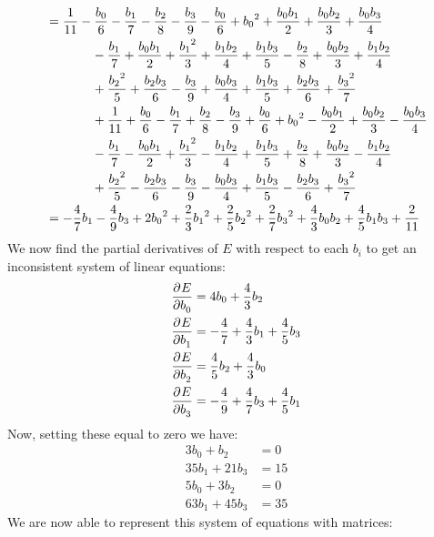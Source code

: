 \documentclass{scrartcl}
\begin{document}
\begin{align*}
&=\frac{1}{11}-\frac{b_0}{6}-\frac{b_1}{7}-\frac{b_2}{8}-\frac{b_3}{9}-\frac{b_0}{6}+{b_0}^2+\frac{b_0b_1}{2}+\frac{b_0b_2}{3}+\frac{b_0b_3}{4}\\
&\hspace{0.5 in}-\frac{b_1}{7}+\frac{b_0b_1}{2}+\frac{{b_1}^2}{3}+\frac{b_1b_2}{4}+\frac{b_1b_3}{5}-\frac{b_2}{8}+\frac{b_0b_2}{3}+\frac{b_1b_2}{4}\\
&\hspace{0.5 in}+\frac{{b_2}^2}{5}+\frac{b_2b_3}{6}-\frac{b_3}{9}+\frac{b_0b_3}{4}+\frac{b_1b_3}{5}+\frac{b_2b_3}{6}+\frac{{b_3}^2}{7}\\
&\hspace{0.5 in}+\frac{1}{11}+\frac{b_0}{6}-\frac{b_1}{7}+\frac{b_2}{8}-\frac{b_3}{9}+\frac{b_0}{6}+{b_0}^2-\frac{b_0b_1}{2}+\frac{b_0b_2}{3}-\frac{b_0b_3}{4}\\
&\hspace{0.5 in}-\frac{b_1}{7}-\frac{b_0b_1}{2}+\frac{{b_1}^2}{3}-\frac{b_1b_2}{4}+\frac{b_1b_3}{5}+\frac{b_2}{8}+\frac{b_0b_2}{3}-\frac{b_1b_2}{4}\\
&\hspace{0.5 in}+\frac{{b_2}^2}{5}-\frac{b_2b_3}{6}-\frac{b_3}{9}-\frac{b_0b_3}{4}+\frac{b_1b_3}{5}-\frac{b_2b_3}{6}+\frac{{b_3}^2}{7}\\
&=-\frac{4}{7}b_1-\frac{4}{9}b_3+2{b_0}^2+\frac{2}{3}{b_1}^2+\frac{2}{5}{b_2}^2+\frac{2}{7}{b_3}^2+\frac{4}{3}b_0b_2+\frac{4}{5}b_1b_3+\frac{2}{11}
\end{align*}
We now find the partial derivatives of $E$ with respect to each $b_i$ to get an inconsistent system of linear equations:
\begin{align*}
\dpd{E}{b_0}&=4b_0+\frac{4}{3}b_2\\
\dpd{E}{b_1}&=-\frac{4}{7}+\frac{4}{3}b_1+\frac{4}{5}b_3\\
\dpd{E}{b_2}&=\frac{4}{5}b_2+\frac{4}{3}b_0\\
\dpd{E}{b_3}&=-\frac{4}{9}+\frac{4}{7}b_3+\frac{4}{5}b_1
\end{align*}
Now, setting these equal to zero we have:
\begin{align*}
3b_0+b_2&=0\\
35b_1+21b_3&=15\\
5b_0+3b_2&=0\\
63b_1+45b_3&=35
\end{align*}
We are now able to represent this system of equations with matrices:
\end{document}
